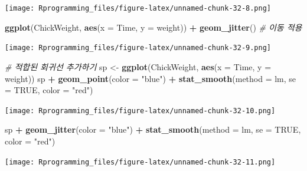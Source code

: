 \documentclass[10pt,]{krantz}
\makeatletter
\newenvironment{Shaded}{\begin{snugshade}}{\end{snugshade}}
\newcommand{\KeywordTok}[1]{\textcolor[rgb]{0.13,0.29,0.53}{\textbf{#1}}}
\newcommand{\DataTypeTok}[1]{\textcolor[rgb]{0.13,0.29,0.53}{#1}}
\newcommand{\StringTok}[1]{\textcolor[rgb]{0.31,0.60,0.02}{#1}}
\newcommand{\CommentTok}[1]{\textcolor[rgb]{0.56,0.35,0.01}{\textit{#1}}}
\newcommand{\OtherTok}[1]{\textcolor[rgb]{0.56,0.35,0.01}{#1}}
\newcommand{\OperatorTok}[1]{\textcolor[rgb]{0.81,0.36,0.00}{\textbf{#1}}}
\newcommand{\NormalTok}[1]{#1}
\newenvironment{kframe}{%
\medskip{}
\setlength{\fboxsep}{.8em}
 \def\at@end@of@kframe{}%
 \ifinner\ifhmode%
  \def\at@end@of@kframe{\end{minipage}}%
  \begin{minipage}{\columnwidth}%
 \fi\fi%
 \def\FrameCommand##1{\hskip\@totalleftmargin \hskip-\fboxsep
 \colorbox{shadecolor}{##1}\hskip-\fboxsep
     \hskip-\linewidth \hskip-\@totalleftmargin \hskip\columnwidth}%
 \MakeFramed {\advance\hsize-\width
   \@totalleftmargin\z@ \linewidth\hsize
   \@setminipage}}%
 {\par\unskip\endMakeFramed%
 \at@end@of@kframe}
\renewenvironment{Shaded}{\begin{kframe}}{\end{kframe}}
\theoremstyle{definition}
\theoremstyle{definition}
\theoremstyle{remark}
\makeatother
\begin{document}
\texttt{[image: Rprogramming\_files/figure-latex/unnamed-chunk-32-8.png]}

\begin{Shaded}
\begin{Highlighting}[]


\KeywordTok{ggplot}\NormalTok{(ChickWeight, }\KeywordTok{aes}\NormalTok{(}\DataTypeTok{x =}\NormalTok{ Time, }\DataTypeTok{y =}\NormalTok{ weight)) }\OperatorTok{+}\StringTok{ }\KeywordTok{geom_jitter}\NormalTok{() }\CommentTok{# 이동 적용}
\end{Highlighting}
\end{Shaded}

\texttt{[image: Rprogramming\_files/figure-latex/unnamed-chunk-32-9.png]}

\begin{Shaded}
\begin{Highlighting}[]


\CommentTok{# 적합된 회귀선 추가하기}
\NormalTok{sp <-}\StringTok{ }\KeywordTok{ggplot}\NormalTok{(ChickWeight, }\KeywordTok{aes}\NormalTok{(}\DataTypeTok{x =}\NormalTok{ Time, }\DataTypeTok{y =}\NormalTok{ weight)) }
\NormalTok{sp }\OperatorTok{+}\StringTok{ }\KeywordTok{geom_point}\NormalTok{(}\DataTypeTok{color =} \StringTok{"blue"}\NormalTok{) }\OperatorTok{+}\StringTok{ }\KeywordTok{stat_smooth}\NormalTok{(}\DataTypeTok{method =}\NormalTok{ lm, }\DataTypeTok{se =} \OtherTok{TRUE}\NormalTok{, }\DataTypeTok{color =} \StringTok{"red"}\NormalTok{) }
\end{Highlighting}
\end{Shaded}

\texttt{[image: Rprogramming\_files/figure-latex/unnamed-chunk-32-10.png]}

\begin{Shaded}
\begin{Highlighting}[]


\NormalTok{sp }\OperatorTok{+}\StringTok{ }\KeywordTok{geom_jitter}\NormalTok{(}\DataTypeTok{color =} \StringTok{"blue"}\NormalTok{) }\OperatorTok{+}\StringTok{ }\KeywordTok{stat_smooth}\NormalTok{(}\DataTypeTok{method =}\NormalTok{ lm, }\DataTypeTok{se =} \OtherTok{TRUE}\NormalTok{, }\DataTypeTok{color =} \StringTok{"red"}\NormalTok{)}
\end{Highlighting}
\end{Shaded}

\texttt{[image: Rprogramming\_files/figure-latex/unnamed-chunk-32-11.png]}
\end{document}
